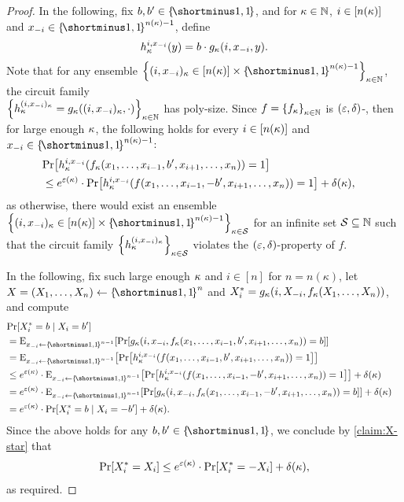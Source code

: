 \begin{proposition}
    \propHardToGuessComp
\end{proposition}
\begin{proof}
    
    In the following, fix $b,b' \in \oo$, and for $\kappa \in {\mathbb{N}}$, $i \in [n(\kappa)]$ and $x_{-i} \in \oo^{n(\pk)-1}$, define 
    \begin{align*}
        h_{\kappa}^{i,x_{-i}}(y) = b\cdot g_{\kappa}(i,x_{-i},y).
    \end{align*}
    Note that for any ensemble $\set{(i,x_{-i})_{\pk} \in [n(\pk)]\times \oo^{n(\pk)-1}}_{\pk \in \bbN}$, the circuit family \\$\set{h_{\pk}^{(i, x_{-i})_{\pk}} = g_{\pk}((i,x_{-i})_{\pk},\cdot)}_{\pk \in \bbN}$ has poly-size. 
    Since $f = \set{f_{\pk}}_{\pk \in \bbN}$ is $(\varepsilon,\delta)$-\CDP, then for large enough $\kappa$, the following holds for every $i \in [n(\kappa)]$ and $x_{-i} \in \oo^{n(\pk)-1}$:
    \begin{align*}
        \lefteqn{\pr{h_{\pk}^{i, x_{-i}}(f_{\pk}(x_1,\ldots,x_{i-1}, b', x_{i+1},\ldots,x_n)) = 1}}\\
        &\leq e^{\eps(\pk)}\cdot \pr{h_{\pk}^{i,x_{-i}}(f(x_1,\ldots,x_{i-1}, -b', x_{i+1},\ldots,x_n)) = 1} + \delta(\pk),
    \end{align*}
    as otherwise, there would exist an ensemble $\set{(i,x_{-i})_{\pk} \in [n(\pk)]\times \oo^{n(\pk)-1}}_{\pk \in \cS}$ for an infinite set ${\cal S} \subseteq {\mathbb{N}}$ such that the circuit family 
    $\set{h_{\pk}^{(i, x_{-i})_{\pk}}}_{\pk \in \cS}$ violates the $(\varepsilon,\delta)$-\CDP property of $f$. 

    In the following, fix such large enough $\kappa$ and $i \in [n]$ for $n = n(\kappa)$, let $X = (X_1,\ldots,X_{n}) \la \oo^{n}$ and $X_i^* = g_{\kappa}(i,X_{-i},f_{\kappa}(X_1,\ldots,X_n))$, and compute
    \begin{align*}
        \lefteqn{\pr{X_i^* = b \mid X_i = b'}}\\
        &= \eex{x_{-i} \la \oo^{n-1}}{\pr{g_{\pk}(i,x_{-i}, f_{\pk}(x_1,\ldots,x_{i-1}, b', x_{i+1},\ldots,x_n)) = b }}\\
        &= \eex{x_{-i} \la \oo^{n-1}}{\pr{h_{\pk}^{i,x_{-i}}(f(x_1,\ldots,x_{i-1}, b', x_{i+1},\ldots,x_n)) = 1}}\\
        &\leq e^{\eps(\pk)}\cdot \eex{x_{-i} \la \oo^{n-1}}{\pr{h_{\pk}^{i,x_{-i}}(f(x_1,\ldots,x_{i-1}, -b', x_{i+1},\ldots,x_n)) = 1}} + \delta(\pk)\\
        &= e^{\eps(\pk)}\cdot \eex{x_{-i} \la \oo^{n-1}}{\pr{g_{\pk}(i,x_{-i}, f_{\pk}(x_1,\ldots,x_{i-1}, -b', x_{i+1},\ldots,x_n)) = b}} + \delta(\pk)\\
        &= e^{\eps(\pk)}\cdot\pr{X_i^* = b \mid X_i = -b'}+\delta(\pk).
    \end{align*}
    Since the above holds for any $b, b' \in \oo$, we conclude by \cref{claim:X-star} that 
    \begin{align*}
        \pr{X_i^* = X_i} \leq e^{\eps(\pk)}\cdot \pr{X_i^* = -X_i} + \delta(\pk),
    \end{align*}
    as required.
\end{proof}

